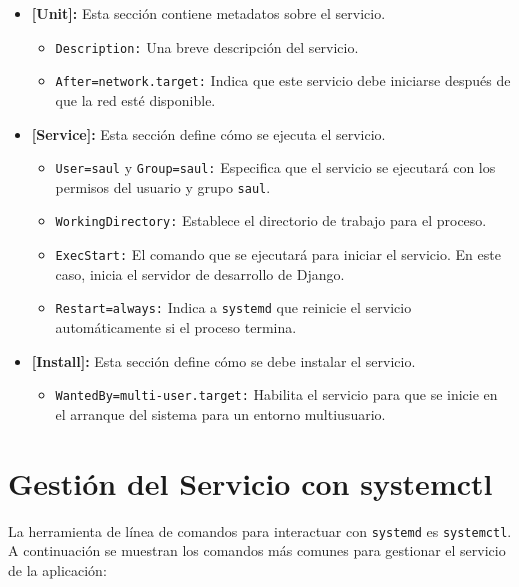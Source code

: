 \begin{itemize}
    \item \textbf{[Unit]:} Esta sección contiene metadatos sobre el servicio.
    \begin{itemize}
        \item \texttt{Description:} Una breve descripción del servicio.
        \item \texttt{After=network.target:} Indica que este servicio debe iniciarse después de que la red esté disponible.
    \end{itemize}
    \item \textbf{[Service]:} Esta sección define cómo se ejecuta el servicio.
    \begin{itemize}
        \item \texttt{User=saul} y \texttt{Group=saul:} Especifica que el servicio se ejecutará con los permisos del usuario y grupo \texttt{saul}.
        \item \texttt{WorkingDirectory:} Establece el directorio de trabajo para el proceso.
        \item \texttt{ExecStart:} El comando que se ejecutará para iniciar el servicio. En este caso, inicia el servidor de desarrollo de Django.
        \item \texttt{Restart=always:} Indica a \texttt{systemd} que reinicie el servicio automáticamente si el proceso termina.
    \end{itemize}
    \item \textbf{[Install]:} Esta sección define cómo se debe instalar el servicio.
    \begin{itemize}
        \item \texttt{WantedBy=multi-user.target:} Habilita el servicio para que se inicie en el arranque del sistema para un entorno multiusuario.
    \end{itemize}
\end{itemize}

\section{Gestión del Servicio con systemctl}

La herramienta de línea de comandos para interactuar con \texttt{systemd} es \texttt{systemctl}. A continuación se muestran los comandos más comunes para gestionar el servicio de la aplicación:

